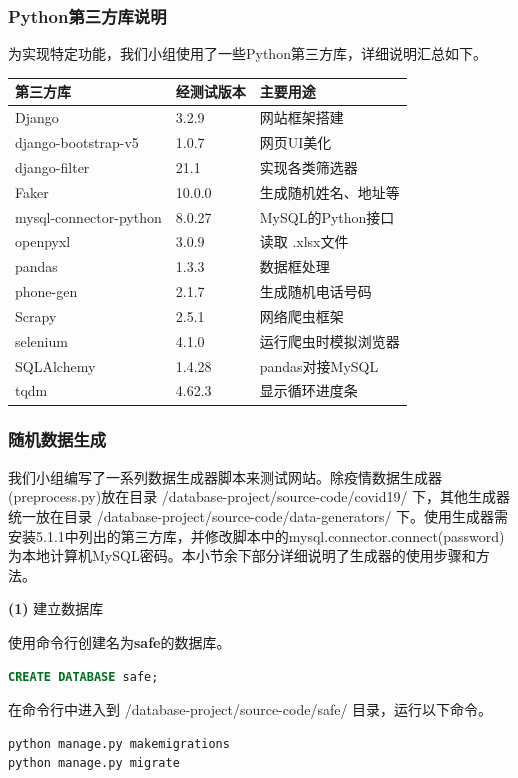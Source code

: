\documentclass[12pt]{article}
\begin{document}
\subsubsection{Python第三方库说明}
为实现特定功能，我们小组使用了一些Python第三方库，详细说明汇总如下。

\begin{center}
\begin{tabular}{lll}
\toprule
\textbf{第三方库}  & \textbf{经测试版本} & \textbf{主要用途} \\
\midrule
Django & 3.2.9 & 网站框架搭建 \\
django-bootstrap-v5 & 1.0.7 & 网页UI美化 \\
django-filter & 21.1 & 实现各类筛选器 \\
Faker & 10.0.0 & 生成随机姓名、地址等 \\
mysql-connector-python & 8.0.27 & MySQL的Python接口 \\
openpyxl & 3.0.9 & 读取 .xlsx文件 \\
pandas & 1.3.3 & 数据框处理 \\
phone-gen & 2.1.7 & 生成随机电话号码 \\
Scrapy & 2.5.1 & 网络爬虫框架 \\
selenium & 4.1.0 & 运行爬虫时模拟浏览器 \\ 
SQLAlchemy & 1.4.28 & pandas对接MySQL \\
tqdm & 4.62.3 & 显示循环进度条 \\
\bottomrule
\end{tabular}
\end{center}		

\subsubsection{随机数据生成}
我们小组编写了一系列数据生成器脚本来测试网站。除疫情数据生成器(preprocess.py)放在目录 /database-project/source-code/covid19/ 下，其他生成器统一放在目录 /database-project/source-code/data-generators/ 下。使用生成器需安装5.1.1中列出的第三方库，并修改脚本中的mysql.connector.connect(password)为本地计算机MySQL密码。本小节余下部分详细说明了生成器的使用步骤和方法。

\noindent \textbf{(1)} 建立数据库 \par
使用命令行创建名为\textbf{safe}的数据库。
\begin{lstlisting}[language=SQL]
CREATE DATABASE safe;
\end{lstlisting}

在命令行中进入到 /database-project/source-code/safe/ 目录，运行以下命令。
\begin{lstlisting}[language=bash]
python manage.py makemigrations
python manage.py migrate
\end{lstlisting}
\end{document}
